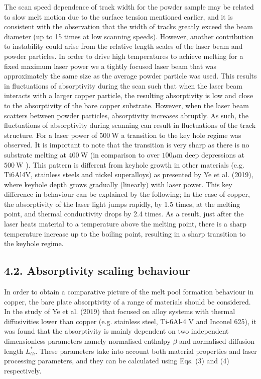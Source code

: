 \documentclass[10pt]{article}
\begin{document}
The scan speed dependence of track width for the powder sample may be related to slow melt motion due to the surface tension mentioned earlier, and it is consistent with the observation that the width of tracks greatly exceed the beam diameter (up to 15 times at low scanning speeds). However, another contribution to instability could arise from the relative length scales of the laser beam and powder particles. In order to drive high temperatures to achieve melting for a fixed maximum laser power we a tightly focused laser beam that was approximately the same size as the average powder particle was used. This results in fluctuations of absorptivity during the scan such that when the laser beam interacts with a larger copper particle, the resulting absorptivity is low and close to the absorptivity of the bare copper substrate. However, when the laser beam scatters between powder particles, absorptivity increases abruptly. As such, the fluctuations of absorptivity during scanning can result in fluctuations of the track structure. For a laser power of $500 \mathrm{~W}$ a transition to the key hole regime was observed. It is important to note that the transition is very sharp as there is no substrate melting at $400 \mathrm{~W}$ (in comparison to over $100 \mu \mathrm{m}$ deep depressions at $500 \mathrm{~W}$ ). This pattern is different from keyhole growth in other materials (e.g. Ti6Al4V, stainless steels and nickel superalloys) as presented by Ye et al. (2019), where keyhole depth grows gradually (linearly) with laser power. This key difference in behaviour can be explained by the following; In the case of copper, the absorptivity of the laser light jumps rapidly, by 1.5 times, at the melting point, and thermal conductivity drops by 2.4 times. As a result, just after the laser heats material to a temperature above the melting point, there is a sharp temperature increase up to the boiling point, resulting in a sharp transition to the keyhole regime.

\subsection*{4.2. Absorptivity scaling behaviour}
In order to obtain a comparative picture of the melt pool formation behaviour in copper, the bare plate absorptivity of a range of materials should be considered. In the study of Ye et al. (2019) that focused on alloy systems with thermal diffusivities lower than copper (e.g. stainless steel, Ti-6Al-4 V and Inconel 625), it was found that the absorptivity is mainly dependent on two independent dimensionless parameters namely normalised enthalpy $\beta$ and normalised diffusion length $L_{t h}^{*}$. These parameters take into account both material properties and laser processing parameters, and they can be calculated using Eqs. (3) and (4) respectively.
\end{document}
